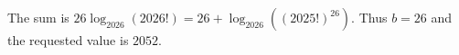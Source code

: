 The sum is $26\log_{2026}(2026!)=26+\log_{2026}((2025!)^{26})$. Thus $b=26$ and the requested value is $\boxed{2052}$.
